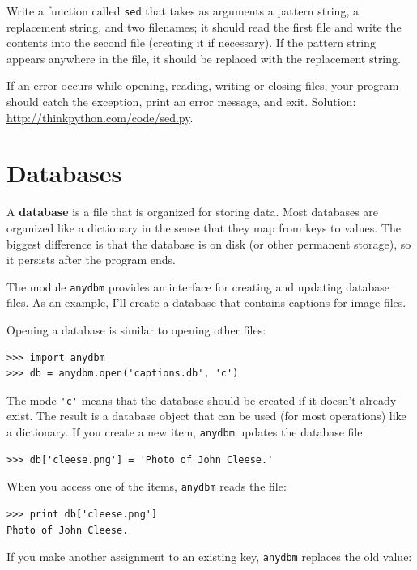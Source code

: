 \documentclass[10pt]{book}
\begin{document}
\begin{CJK}{UTF8}{gbsn}
\begin{exercise}

Write a function called {\tt sed} that takes as arguments a pattern string,
a replacement string, and two filenames; it should read the first file
and write the contents into the second file (creating it if
necessary).  If the pattern string appears anywhere in the file, it
should be replaced with the replacement string.

If an error occurs while opening, reading, writing or closing files,
your program should catch the exception, print an error message, and
exit.  Solution: \url{http://thinkpython.com/code/sed.py}.

\end{exercise}


\section{Databases}

A {\bf database} is a file that is organized for storing data.
Most databases are organized like a dictionary in the sense
that they map from keys to values.  The biggest difference
is that the database is on disk (or other permanent storage),
so it persists after the program ends.

The module {\tt anydbm} provides an interface for creating
and updating database files.  As an example, I'll create a database
that contains captions for image files.

Opening a database is similar to opening other files:

\begin{verbatim}
>>> import anydbm
>>> db = anydbm.open('captions.db', 'c')
\end{verbatim}
%
The mode \verb"'c'" means that the database should be created if
it doesn't already exist.  The result is a database object
that can be used (for most operations) like a dictionary.
If you create a new item, {\tt anydbm} updates the database file.


\begin{verbatim}
>>> db['cleese.png'] = 'Photo of John Cleese.'
\end{verbatim}
%
When you access one of the items, {\tt anydbm} reads the file:

\begin{verbatim}
>>> print db['cleese.png']
Photo of John Cleese.
\end{verbatim}
%
If you make another assignment to an existing key, {\tt anydbm} replaces
the old value:


\end{CJK}
\end{document}
